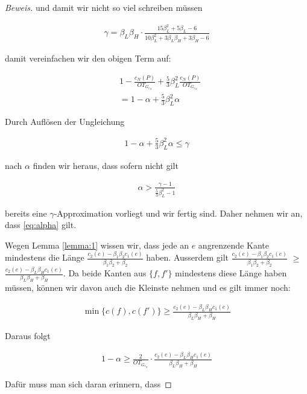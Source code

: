 \documentclass[a4paper,11pt]{scrreprt}
\begin{document}
\begin{proof}[Beweis]
und damit wir nicht so viel schreiben müssen

\begin{align}
\gamma = \beta_L\beta_H \cdot \frac{15\beta_L^2 + 5\beta_L - 6}{10\beta_L^2 + 3\beta_L\beta_H + 3\beta_H -6}
\label{eq:gamma}
\end{align}

damit vereinfachen wir den obigen Term auf:

\begin{align*}
& 1 - \frac{c_N(P)}{OT_{G_{c_N}}} + \frac{5}{3}\beta_L^2 \frac{c_N(P)}{OT_{G_{c_N}}}\\
&= 1 - \alpha + \frac{5}{3}\beta_L^2\alpha
\end{align*}

Durch Auflösen der Ungleichung 

\begin{align*}
1 - \alpha + \frac{5}{3}\beta_L^2\alpha \le \gamma
\end{align*}

nach $\alpha$ finden wir heraus, dass sofern nicht gilt

\begin{align}
\alpha > \frac{\gamma - 1}{\frac{5}{3}\beta_L^2 - 1}
\label{eq:alpha}
\end{align}

bereits eine $\gamma$-Approximation vorliegt und wir fertig sind. Daher nehmen wir an, dass \ref{eq:alpha} gilt.

Wegen Lemma \ref{lemma:1} wissen wir, dass jede an $e$ angrenzende Kante mindestens die Länge $\frac{c_2(e) - \beta_1\beta_2 c_1(e)}{\beta_1\beta_2 + \beta_2}$ haben. Ausserdem gilt $\frac{c_2(e) - \beta_1\beta_2 c_1(e)}{\beta_1\beta_2 + \beta_2}$ $\ge$ $\frac{c_2(e) - \beta_L\beta_H c_1(e)}{\beta_L\beta_H + \beta_H}$. Da beide Kanten aus $\{f, f'\}$ mindestens diese Länge haben müssen, können wir davon auch die Kleinste nehmen und es gilt immer noch:

\begin{align*}
\min\{c(f), c(f')\} \ge \frac{c_2(e) - \beta_L\beta_H c_1(e)}{\beta_L\beta_H + \beta_H}
\end{align*}

Daraus folgt

\begin{align*}
1 - \alpha \ge \frac{2}{OT_{G_{c_N}}} \cdot \frac{c_2(e) - \beta_L\beta_H c_1(e)}{\beta_L\beta_H + \beta_H}
\end{align*}

Dafür muss man sich daran erinnern, dass


\end{proof}
\end{document}

